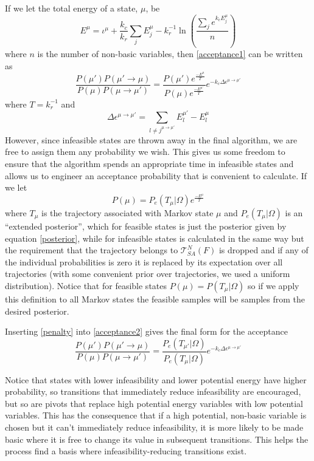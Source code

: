 \documentclass{article}
\begin{document}
If we let the total energy of a state, $\mu$, be
\begin{equation}
E^\mu = 
\iota^\mu
+ \frac{k_c}{k_r}\sum_j E^\mu_j
- k_r^{-1}\ln\left(\frac{\sum_j e^{k_c E^\mu_j}}{n}\right)
\label{energy}
\end{equation}
where $n$ is the number of non-basic variables, then \eqref{acceptance1} can be written as
\begin{equation}
\frac{P(\mu')P(\mu'\to\mu)}{P(\mu)P(\mu\to\mu')} 
=
\frac{P(\mu')e^{\frac{-E^{\mu}}{T}}}
	{P(\mu)e^{\frac{-E^{\mu'}}{T}}} e^{-k_c \Delta \epsilon^{\mu\to\mu'}}
\label{acceptance2}
\end{equation}
where $T = k_r^{-1}$ and 
\[
\Delta \epsilon^{\mu\to\mu'} = \sum_{l\ne j^{\mu\to\mu'}} E^{\mu'}_l - E^\mu_l
\]
However, since infeasible states are thrown away in the final algorithm, we are free to assign them any probability we wish. This gives us some freedom to ensure that the algorithm spends an appropriate time in infeasible states and allows us to engineer an acceptance probability that is convenient to calculate. If we let
\begin{equation}
P(\mu) = P_e(T_\mu|\Omega)e^\frac{-E^\mu}{T}
\label{penalty}
\end{equation}
where $T_\mu$ is the trajectory associated with Markov state $\mu$ and $P_e(T_\mu|\Omega)$ is an ``extended posterior'', which for feasible states is just the posterior given by equation \eqref{posterior}, while for infeasible states is calculated in the same way but the requirement that the trajectory belongs to $\mathcal{T}^N_{SA}(F)$ is dropped and if any of the individual probabilities is zero it is replaced by its expectation over all trajectories (with some convenient prior over trajectories, we used a uniform distribution). Notice that for feasible states $P(\mu) = P(T_\mu|\Omega)$ so if we apply this definition to all Markov states the feasible samples will be samples from the desired posterior.

Inserting \eqref{penalty} into \eqref{acceptance2} gives the final form for the acceptance
\begin{equation}
\frac{P(\mu')P(\mu'\to\mu)}{P(\mu)P(\mu\to\mu')} 
=
\frac{P_e(T_{\mu'}|\Omega)}{P_e(T_\mu|\Omega)}
e^{-k_c\Delta \epsilon^{\mu\to\mu'}}
\end{equation}

Notice that states with lower infeasibility and lower potential energy have higher probability, so transitions that immediately reduce infeasibility are encouraged, but so are pivots that replace high potential energy variables with low potential variables. This has the consequence that if a high potential, non-basic variable is chosen but it can't immediately reduce infeasibility, it is more likely to be made basic where it is free to change its value in subsequent transitions. This helps the process find a basis where infeasibility-reducing transitions exist.
\end{document}
